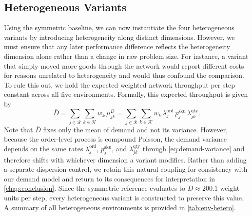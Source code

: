 \subsection{Heterogeneous Variants}
\label{subsec:heterogeneous-variants}
Using the symmetric baseline, we can now instantiate the four heterogeneous variants by introducing heterogeneity along distinct dimensions. However, we must ensure that any later performance difference reflects the heterogeneity dimension alone rather than a change in raw problem size. For instance, a variant that simply moved more goods through the network would report different costs for reasons unrelated to heterogeneity and would thus confound the comparison. To rule this out, we hold the expected weighted network throughput per step constant across all five environments. Formally, this expected throughput is given by
\begin{equation}
\label{eq:throughput-invariant}
  \bar{D} = \sum_{j \in \mathcal{R}} \sum_{k \in \mathcal{K}} w_k\, \mu^D_{jk}
    = \sum_{j \in \mathcal{R}} \sum_{k \in \mathcal{K}} w_k\, \lambda^{\mathrm{ord}}_{j}\, p^{\mathrm{sku}}_{j}\, \lambda^{\mathrm{qty}}_{jk}.
\end{equation}
Note that $\bar{D}$ fixes only the mean of demand and not its variance. However, because the order-level process is compound Poisson, the demand variance depends on the same rates $\lambda^{\mathrm{ord}}_{j}$, $p^{\mathrm{sku}}_{j}$, and $\lambda^{\mathrm{qty}}_{jk}$ through \autoref{eq:demand-variance} and therefore shifts with whichever dimension a variant modifies. Rather than adding a separate dispersion control, we retain this natural coupling for consistency with our demand model and return to its consequences for interpretation in \autoref{chap:conclusion}. Since the symmetric reference evaluates to $\bar{D}\approx200.1$ weight-units per step, every heterogeneous variant is constructed to preserve this value. A summary of all heterogeneous environments is provided in \autoref{tab:env-hetero}.


